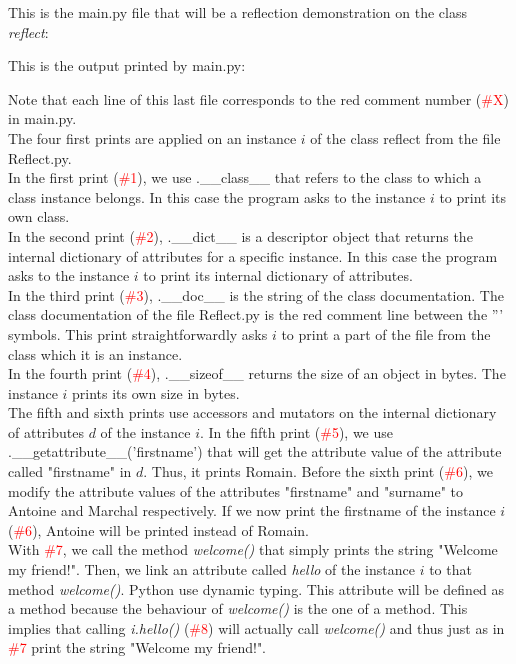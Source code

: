 This is the main.py file that will be a reflection demonstration on the class \emph{reflect}:


This is the output printed by main.py:

Note that each line of this last file corresponds to the red comment number (\textcolor{red}{\#X}) in main.py.\\ 

The four first prints are applied on an instance $i$ of the class reflect from the file Reflect.py.\\
In the first print (\textcolor{red}{\#1}), we use .\_\_class\_\_ that refers to the class to which a class instance belongs. In this case the program asks to the instance $i$ to print its own class.\\
In the second print (\textcolor{red}{\#2}), .\_\_dict\_\_ is a descriptor object that returns the internal dictionary of attributes for a specific instance. In this case the program asks to the instance $i$ to print its internal dictionary of attributes.\\
In the third print (\textcolor{red}{\#3}), .\_\_doc\_\_ is the string of the class documentation. The class documentation of the file Reflect.py is the red comment line between the ''' symbols. This print straightforwardly asks $i$ to print a part of the file from the class which it is an instance.\\ 
In the fourth print (\textcolor{red}{\#4}), .\_\_sizeof\_\_ returns the size of an object in bytes. The instance $i$ prints its own size in bytes.\\

The fifth and sixth prints use accessors and mutators on the internal dictionary of attributes $d$ of the instance $i$.
In the fifth print (\textcolor{red}{\#5}), we use .\_\_getattribute\_\_('firstname') that will get the attribute value of the attribute called "firstname" in $d$. Thus, it prints Romain.
Before the sixth print (\textcolor{red}{\#6}), we modify the attribute values of the attributes "firstname" and "surname" to Antoine and Marchal respectively. If we now print the firstname of the instance $i$ (\textcolor{red}{\#6}), Antoine will be printed instead of Romain.\\

With \textcolor{red}{\#7}, we call the method \emph{welcome()} that simply prints the string "Welcome my friend!". Then, we link an attribute called \emph{hello} of the instance $i$ to that method \emph{welcome()}. Python use dynamic typing. This attribute will be defined as a method because the behaviour of \emph{welcome()} is the one of a method. This implies that calling \emph{i.hello()} (\textcolor{red}{\#8}) will actually call \emph{welcome()} and thus just as in \textcolor{red}{\#7} print the string "Welcome my friend!".\\

